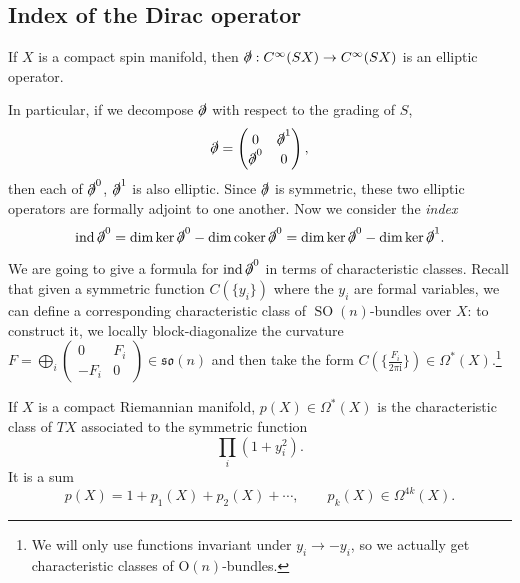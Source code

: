\documentclass[12pt,letterpaper,reqno]{article}
\numberwithin{equation}{section}
\newcommand{\fso}{{\mathfrak {so}}}
\newcommand{\dirac}{\slashed{\partial}}
\newcommand{\I}{{\mathrm i}}
\newcommand{\ti}[1]{\textit{#1}}
\DeclareMathOperator{\ind}{ind}
\DeclareMathOperator{\coker}{coker}
\DeclareMathOperator{\SO}{SO}
\begin{document}
\subsection{Index of the Dirac operator}

\begin{prop} If $X$ is a compact spin manifold, then $\dirac: C^\infty(SX) \to C^\infty(SX)$ 
is an elliptic operator. 
\end{prop}

In particular, if we decompose $\dirac$ with respect to the grading of $S$,
\begin{equation}
  \dirac = \begin{pmatrix} 0 & \dirac^1 \\ \dirac^0 & 0 \end{pmatrix},
\end{equation}
then each of $\dirac^0$, $\dirac^1$ is also elliptic.
Since $\dirac$ is symmetric, these two elliptic operators are formally 
adjoint to one another.
Now we consider the \ti{index}
\begin{equation}
  \ind \dirac^0 = \dim \ker \dirac^0 - \dim \coker \dirac^0 = \dim \ker \dirac^0 - \dim \ker \dirac^1.
\end{equation}

We are going to give a formula for $\ind \dirac^0$ in terms of characteristic
classes.
Recall that given a symmetric function $C(\{y_i\})$ where the $y_i$ are formal variables, 
we can define a corresponding characteristic class of $\SO(n)$-bundles over $X$: 
to construct it, we locally block-diagonalize the curvature 
$F = \bigoplus_i \begin{pmatrix} 0 & F_i \\ -F_i & 0 \end{pmatrix} \in \fso(n)$
and then take the form $C(\{\frac{F_i}{2\pi\I}\}) \in \Omega^*(X)$.\footnote{We 
will only use functions invariant under $y_i \to -y_i$, so we actually 
get characteristic classes of ${\mathrm O}(n)$-bundles.}

\begin{defn} If $X$ is a compact Riemannian manifold, $p(X) \in \Omega^*(X)$
is the characteristic class of $TX$ associated to the symmetric function
\begin{equation}
  \prod_i (1 + y_i^2).
\end{equation}
It is a sum
\begin{equation}
  p(X) = 1 + p_1(X) + p_2(X) + \cdots, \qquad p_k(X) \in \Omega^{4k}(X).
\end{equation}
\end{defn}
\end{document}
